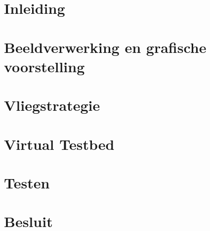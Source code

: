 \documentclass[tt]{penoverslag}
\begin{document}
\maketitlepage


\begin{abstract}



\end{abstract}


\tableofcontents\newpage

%


\rm 

\section*{Inleiding}
\label{sec:Inleiding}



\section{Beeldverwerking en grafische voorstelling}
\label{sec:Beeldverwerking}

\newpage


\section{Vliegstrategie}
\label{sec:Vliegstrategie}

\newpage
\label{key}




\newpage
\section{Virtual Testbed}
\label{sec:Virtual Testbed}




\newpage
\section{Testen}
\label{sec:Testen}


\section*{Besluit}
\label{sec:Besluit}






\end{document}
